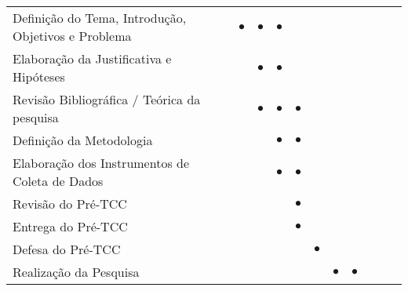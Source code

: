 \begin{table}[!ht]
{{\begin{tabular}{lcccccccccc}
\\
\hline
Definição do Tema, Introdução, Objetivos e Problema                             & \textbf{$\bullet$}   & \textbf{$\bullet$}   & \textbf{$\bullet$}   & \textbf{}    & \textbf{}    & \textbf{}    & \textbf{}    & \textbf{}    &              &              \\
\rowcolor[HTML]{EFEFEF} 
Elaboração da Justificativa e Hipóteses                                          & \textbf{}    & \textbf{$\bullet$}   & \textbf{$\bullet$}   & \textbf{}    & \textbf{}    & \textbf{}    & \textbf{}    & \textbf{}    &              &              \\
Revisão Bibliográfica / Teórica da pesquisa                                      & \textbf{}    & \textbf{$\bullet$}   & \textbf{$\bullet$}   & \textbf{$\bullet$}   & \textbf{}    & \textbf{}    & \textbf{}    & \textbf{}    &              &              \\
\rowcolor[HTML]{EFEFEF} 
Definição da Metodologia                                                         & \textbf{}    & \textbf{}    & \textbf{$\bullet$}   & \textbf{$\bullet$}   & \textbf{}    & \textbf{}    & \textbf{}    & \textbf{}    &              &              \\
Elaboração dos Instrumentos de Coleta de Dados                                   & \textbf{}    & \textbf{}    & \textbf{$\bullet$}   & \textbf{$\bullet$}   & \textbf{}    & \textbf{}    & \textbf{}    & \textbf{}    &              &              \\
\rowcolor[HTML]{EFEFEF} 
Revisão do Pré-TCC                                                               & \textbf{}    & \textbf{}    & \textbf{}    & \textbf{$\bullet$}   & \textbf{}    & \textbf{}    & \textbf{}    & \textbf{}    &              &              \\
Entrega do Pré-TCC                                                               & \textbf{}    & \textbf{}    & \textbf{}    & \textbf{$\bullet$}   & \textbf{}    & \textbf{}    & \textbf{}    & \textbf{}    &              &              \\
\rowcolor[HTML]{EFEFEF} 
Defesa do Pré-TCC                                                                & \textbf{}    & \textbf{}    & \textbf{}    & \textbf{}    & \textbf{$\bullet$}   & \textbf{}    & \textbf{}    & \textbf{}    &              &              \\
Realização da Pesquisa                                                           & \textbf{}    & \textbf{}    & \textbf{}    & \textbf{}    & \textbf{}    & \textbf{$\bullet$}   & \textbf{$\bullet$}   & \textbf{}    &              &              \\

\end{tabular}}}
\end{table}
